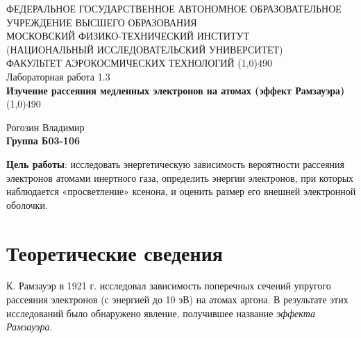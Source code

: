 \documentclass[a4paper,12pt]{article}
\begin{document}
\begin{titlepage}
\begin{center}
\large{\small ФЕДЕРАЛЬНОЕ ГОСУДАРСТВЕННОЕ АВТОНОМНОЕ ОБРАЗОВАТЕЛЬНОЕ\\ УЧРЕЖДЕНИЕ ВЫСШЕГО ОБРАЗОВАНИЯ \\ МОСКОВСКИЙ ФИЗИКО-ТЕХНИЧЕСКИЙ ИНСТИТУТ\\ (НАЦИОНАЛЬНЫЙ ИССЛЕДОВАТЕЛЬСКИЙ УНИВЕРСИТЕТ)\\ ФАКУЛЬТЕТ АЭРОКОСМИЧЕСКИХ ТЕХНОЛОГИЙ}
\vfill
\line(1,0){490}\\[1mm]
\huge{Лабораторная работа 1.3}\\
\huge\textbf{Изучение рассеяния медленных электронов на атомах (эффект Рамзауэра)}\\
\line(1,0){490}\\[1mm]
\vfill
\begin{flushright}
\normalsize{Рогозин Владимир}\\
\normalsize{\textbf{Группа Б03-106}}\\
\end{flushright}
\end{center}
\end{titlepage}

\textbf{Цель работы}:
исследовать энергетическую зависимость вероятности рассеяния электронов атомами инертного газа, определить энергии электронов, при которых наблюдается «просветление» ксенона, и оценить размер его внешней электронной оболочки.




\section{Теоретические сведения}
К. Рамзауэр в 1921 г. исследовал зависимость поперечных сечений упругого рассеяния электронов (с энергией до 10 эВ) на атомах аргона. В результате этих исследований было обнаружено явление, получившее название \textit{эффекта Рамзауэра}.
\end{document}

